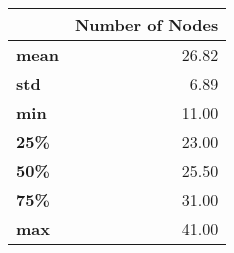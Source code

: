 \begin{tabular}{lr}
\toprule
{} &  Number of Nodes \\
\midrule
\textbf{mean} &            26.82 \\
\textbf{std } &             6.89 \\
\textbf{min } &            11.00 \\
\textbf{25\% } &            23.00 \\
\textbf{50\% } &            25.50 \\
\textbf{75\% } &            31.00 \\
\textbf{max } &            41.00 \\
\bottomrule
\end{tabular}
